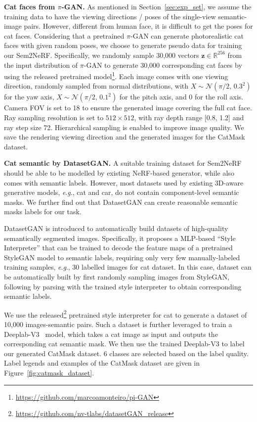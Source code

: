 \documentclass[runningheads]{llncs}
\newcommand{\eg}{\textit{e}.\textit{g}.}
\begin{document}
\textbf{Cat faces from $\pi$-GAN.} As mentioned in Section~\ref{sec:exp_set}, we assume the training data to have the viewing directions / poses of the single-view semantic-image pairs. However, different from human face, it is difficult to get the poses for cat faces. Considering that a pretrained $\pi$-GAN can generate photorealistic cat faces with given random poses, we choose to generate pseudo data for training our Sem2NeRF. Specifically, we randomly sample 30,000 vectors $\mathbf{z}\in\mathbb{R}^{256}$ from the input distribution of $\pi$-GAN to generate 30,000 corresponding cat faces by using the released pretrained model\footnote{\url{https://github.com/marcoamonteiro/pi-GAN}}. Each image comes with one  viewing direction, randomly sampled from normal distributions, with $X \sim \mathcal{N}(\pi /2,\,0.3^{2})$ for the yaw axis, $X \sim \mathcal{N}(\pi /2,\,0.1^{2})$ for the pitch axis, and 0 for the roll axis. Camera FOV is set to 18 to ensure the generated image covering the full cat face. Ray sampling resolution is set to $512\times512$, with ray depth range [0.8, 1.2] and ray step size 72. Hierarchical sampling is enabled to improve image quality. We save the rendering viewing direction and the generated images for the CatMask dataset.

\textbf{Cat semantic by DatasetGAN.} A suitable training dataset for Sem2NeRF should be able to be modelled by existing NeRF-based generator, while also comes with semantic labels. 
However, most datasets used by existing 3D-aware generative models, \eg, cat and car, do not contain component-level semantic masks. We further find out that DatasetGAN can create reasonable semantic masks labels for our task.

DatasetGAN is introduced to automatically build datasets of high-quality semantically segmented images.
Specifically, it proposes a MLP-based ``Style Interpreter'' that can be trained to decode the feature maps of a pretrained StyleGAN model to semantic labels, requiring only very few manually-labeled training samples, \eg, 30 labelled images for cat dataset. In this case, dataset can be automatically built by first randomly sampling images from StyleGAN, following by parsing with the trained style interpreter to obtain corresponding semantic labels. 

We use the released\footnote{\url{https://github.com/nv-tlabs/datasetGAN\_release}} pretrained style interpreter for cat to generate a dataset of 10,000 images-semantic pairs. Such a dataset is further leveraged to train a Deeplab-V3~\cite{chen2017deeplab} model, which takes a cat image as input and outputs the corresponding cat semantic mask. We then use the trained Deeplab-V3 to label our generated CatMask dataset. 6 classes are selected based on the label quality. Label legends and examples of the CatMask dataset are given in Figure~\ref{fig:catmask_dataset}.
\end{document}
